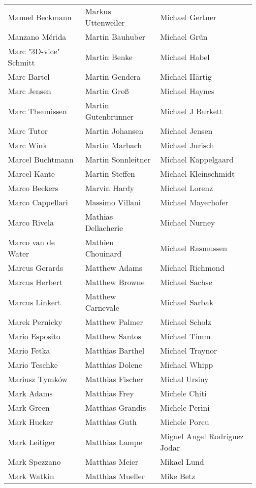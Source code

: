 \begin{tabular}{p{4.5cm}p{4.5cm}p{4.5cm}}
Manuel Beckmann & Markus Uttenweiler & Michael Gertner \\
Manzano Mérida & Martin Bauhuber & Michael Grün \\
Marc "3D-vice" Schmitt & Martin Benke & Michael Habel \\
Marc Bartel & Martin Gendera & Michael Härtig \\
Marc Jensen & Martin Groß & Michael Haynes \\
Marc Theunissen & Martin Gutenbrunner & Michael J Burkett \\
Marc Tutor & Martin Johansen & Michael Jensen \\
Marc Wink & Martin Marbach & Michael Jurisch \\
Marcel Buchtmann & Martin Sonnleitner & Michael Kappelgaard \\
Marcel Kante & Martin Steffen & Michael Kleinschmidt \\
Marco Beckers & Marvin Hardy & Michael Lorenz \\
Marco Cappellari & Massimo Villani & Michael Mayerhofer \\
Marco Rivela & Mathias Dellacherie & Michael Nurney \\
Marco van de Water & Mathieu Chouinard & Michael Rasmussen \\
Marcus Gerards & Matthew Adams & Michael Richmond \\
Marcus Herbert & Matthew Browne & Michael Sachse \\
Marcus Linkert & Matthew Carnevale & Michael Sarbak \\
Marek Pernicky & Matthew Palmer & Michael Scholz \\
Mario Esposito & Matthew Santos & Michael Timm \\
Mario Fetka & Matthias Barthel & Michael Traynor \\
Mario Teschke & Matthias Dolenc & Michael Whipp \\
Mariusz Tymków & Matthias Fischer & Michal Ursiny \\
Mark Adams & Matthias Frey & Michele Chiti \\
Mark Green & Matthias Grandis & Michele Perini \\
Mark Hucker & Matthias Guth & Michele Porcu \\
Mark Leitiger & Matthias Lampe & Miguel Angel Rodriguez Jodar \\
Mark Spezzano & Matthias Meier & Mikael Lund \\
Mark Watkin & Matthias Mueller & Mike Betz \\

\end{tabular}
